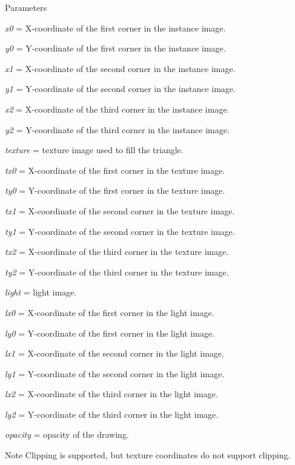 \begin{DoxyParams}{Parameters}
\item[{\em x0}]= X-\/coordinate of the first corner in the instance image. \item[{\em y0}]= Y-\/coordinate of the first corner in the instance image. \item[{\em x1}]= X-\/coordinate of the second corner in the instance image. \item[{\em y1}]= Y-\/coordinate of the second corner in the instance image. \item[{\em x2}]= X-\/coordinate of the third corner in the instance image. \item[{\em y2}]= Y-\/coordinate of the third corner in the instance image. \item[{\em texture}]= texture image used to fill the triangle. \item[{\em tx0}]= X-\/coordinate of the first corner in the texture image. \item[{\em ty0}]= Y-\/coordinate of the first corner in the texture image. \item[{\em tx1}]= X-\/coordinate of the second corner in the texture image. \item[{\em ty1}]= Y-\/coordinate of the second corner in the texture image. \item[{\em tx2}]= X-\/coordinate of the third corner in the texture image. \item[{\em ty2}]= Y-\/coordinate of the third corner in the texture image. \item[{\em light}]= light image. \item[{\em lx0}]= X-\/coordinate of the first corner in the light image. \item[{\em ly0}]= Y-\/coordinate of the first corner in the light image. \item[{\em lx1}]= X-\/coordinate of the second corner in the light image. \item[{\em ly1}]= Y-\/coordinate of the second corner in the light image. \item[{\em lx2}]= X-\/coordinate of the third corner in the light image. \item[{\em ly2}]= Y-\/coordinate of the third corner in the light image. \item[{\em opacity}]= opacity of the drawing. \end{DoxyParams}
\begin{DoxyNote}{Note}
Clipping is supported, but texture coordinates do not support clipping. 
\end{DoxyNote}

